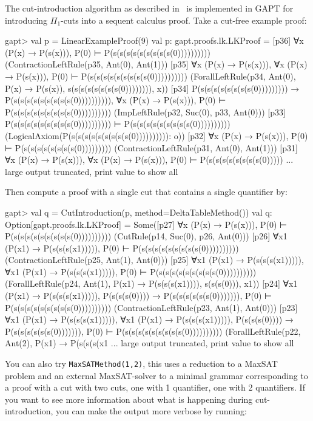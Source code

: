 \documentclass[a4paper,11pt]{book}
\begin{document}
The cut-introduction algorithm as described in~\cite{Hetzl2012,Hetzl14Algorithmic,Hetzl14Introducing} is
implemented in GAPT for introducing $\Pi_1$-cuts into a sequent calculus
proof. Take a cut-free example proof:
\begin{clilisting}
gapt> val p = LinearExampleProof(9)
val p: gapt.proofs.lk.LKProof = [p36] ∀x (P(x) → P(s(x))), P(0) ⊢ P(s(s(s(s(s(s(s(s(s(0))))))))))    (ContractionLeftRule(p35, Ant(0), Ant(1)))
[p35] ∀x (P(x) → P(s(x))), ∀x (P(x) → P(s(x))), P(0) ⊢ P(s(s(s(s(s(s(s(s(s(0))))))))))    (ForallLeftRule(p34, Ant(0), P(x) → P(s(x)), s(s(s(s(s(s(s(s(0)))))))), x))
[p34] P(s(s(s(s(s(s(s(s(0))))))))) → P(s(s(s(s(s(s(s(s(s(0)))))))))),
∀x (P(x) → P(s(x))),
P(0)
⊢
P(s(s(s(s(s(s(s(s(s(0))))))))))    (ImpLeftRule(p32, Suc(0), p33, Ant(0)))
[p33] P(s(s(s(s(s(s(s(s(s(0)))))))))) ⊢ P(s(s(s(s(s(s(s(s(s(0))))))))))    (LogicalAxiom(P(s(s(s(s(s(s(s(s(s(0)))))))))): o))
[p32] ∀x (P(x) → P(s(x))), P(0) ⊢ P(s(s(s(s(s(s(s(s(0)))))))))    (ContractionLeftRule(p31, Ant(0), Ant(1)))
[p31] ∀x (P(x) → P(s(x))), ∀x (P(x) → P(s(x))), P(0) ⊢ P(s(s(s(s(s(s(s(s(0))))) ... large output truncated, print value to show all

\end{clilisting}
Then compute a proof with a single cut that contains a single quantifier by:
\begin{clilisting}
gapt> val q = CutIntroduction(p, method=DeltaTableMethod())
val q: Option[gapt.proofs.lk.LKProof] = Some([p27] ∀x (P(x) → P(s(x))), P(0) ⊢ P(s(s(s(s(s(s(s(s(s(0))))))))))    (CutRule(p14, Suc(0), p26, Ant(0)))
[p26] ∀x1 (P(x1) → P(s(s(s(x1))))), P(0) ⊢ P(s(s(s(s(s(s(s(s(s(0))))))))))    (ContractionLeftRule(p25, Ant(1), Ant(0)))
[p25] ∀x1 (P(x1) → P(s(s(s(x1))))),
∀x1 (P(x1) → P(s(s(s(x1))))),
P(0)
⊢
P(s(s(s(s(s(s(s(s(s(0))))))))))    (ForallLeftRule(p24, Ant(1), P(x1) → P(s(s(s(x1)))), s(s(s(0))), x1))
[p24] ∀x1 (P(x1) → P(s(s(s(x1))))),
P(s(s(s(0)))) → P(s(s(s(s(s(s(0))))))),
P(0)
⊢
P(s(s(s(s(s(s(s(s(s(0))))))))))    (ContractionLeftRule(p23, Ant(1), Ant(0)))
[p23] ∀x1 (P(x1) → P(s(s(s(x1))))),
∀x1 (P(x1) → P(s(s(s(x1))))),
P(s(s(s(0)))) → P(s(s(s(s(s(s(0))))))),
P(0)
⊢
P(s(s(s(s(s(s(s(s(s(0))))))))))    (ForallLeftRule(p22, Ant(2), P(x1) → P(s(s(s(x1 ... large output truncated, print value to show all

\end{clilisting}

You can also try \texttt{MaxSATMethod(1,2)}, this uses a reduction to a MaxSAT
problem and an external MaxSAT-solver to a
minimal grammar corresponding to a proof with a cut with two cuts, one with 1
quantifier, one with 2 quantifiers.  If you want to see more information
about what is happening during cut-introduction, you can make the output more
verbose by running:
\end{document}

